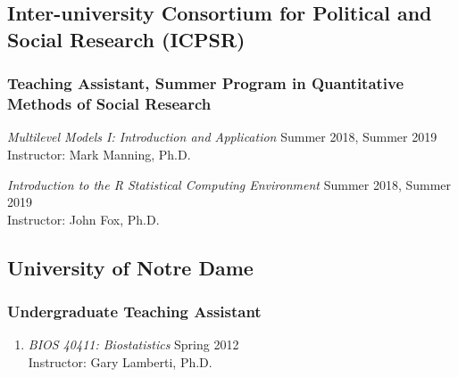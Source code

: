 \documentclass[letterpaper,11pt]{article} %
\begin{document}
	\subsection*{Inter-university Consortium for Political and Social Research (ICPSR)}
	\subsubsection*{Teaching Assistant, Summer Program in Quantitative Methods of Social Research}
	\begin{etaremune}
		\item \textit{Multilevel Models I: Introduction and Application} \hfill Summer 2018, Summer 2019\\
		Instructor: Mark Manning, Ph.D.
		
		\item \textit{Introduction to the R Statistical Computing Environment} \hfill Summer 2018, Summer 2019 \\
		Instructor: John Fox, Ph.D.
	\end{etaremune}
	
	\subsection*{University of Notre Dame}
	\subsubsection*{Undergraduate Teaching Assistant}
	\begin{enumerate}
		\item \textit{BIOS 40411: Biostatistics} \hfill Spring 2012 \\
		Instructor: Gary Lamberti, Ph.D.
	\end{enumerate}
	
\end{document}
